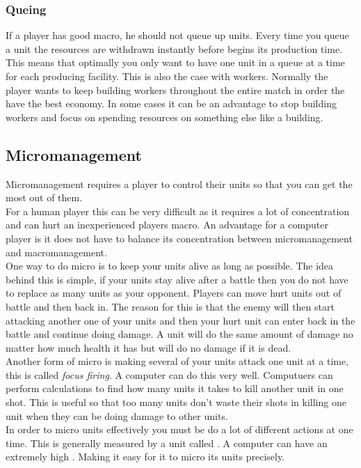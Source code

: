 			\subsubsection{Queing}
				If a player has good macro, he should not queue up units. 
				Every time you queue a unit the resources are withdrawn instantly before begins its production time. This means that optimally you only want to have one unit in a queue at a time for each producing facility.
				This is also the case with workers. Normally the player wants to keep building workers throughout the entire match in order the have the best economy.
				In some cases it can be an advantage to stop building workers and focus on spending resources on something else like a building.
				
				
	\subsection{Micromanagement}
		Micromanagement requires a player to control their units so that you can get the most out of them.\\
		
		For a human player this can be very difficult as it requires a lot of concentration and can hurt an inexperienced players macro. 
		An advantage for a computer player is it does not have to balance its concentration between micromanagement and macromanagement.\\
		
		One way to do micro is to keep your units alive as long as possible. 
		The idea behind this is simple, if your units stay alive after a battle then you do not have to replace as many units as your opponent. 
		Players can move hurt units out of battle and then back in. 
		The reason for this is that the enemy will then start attacking another one of your 
		units and then your hurt unit can enter back in the battle and continue doing damage. 
		A unit will do the same amount of damage no matter how much health it has but will do no damage if it is dead.\\
		
		Another form of micro is making several of your units attack one unit at a time, this is called \textit{focus firing}.
		A computer can do this very well. Computuers can perform calculations to find how many units it takes to kill another unit in one shot.
		This is useful so that too many units don't waste their shots in killing one unit when they can be doing damage to other units.\\
		In order to micro units effectively you must be do a lot of different actions at one time. 
		This is generally measured by a unit called \abapm. 
		A computer can have an extremely high \abapm. Making it easy for it to micro its units precisely.
		
